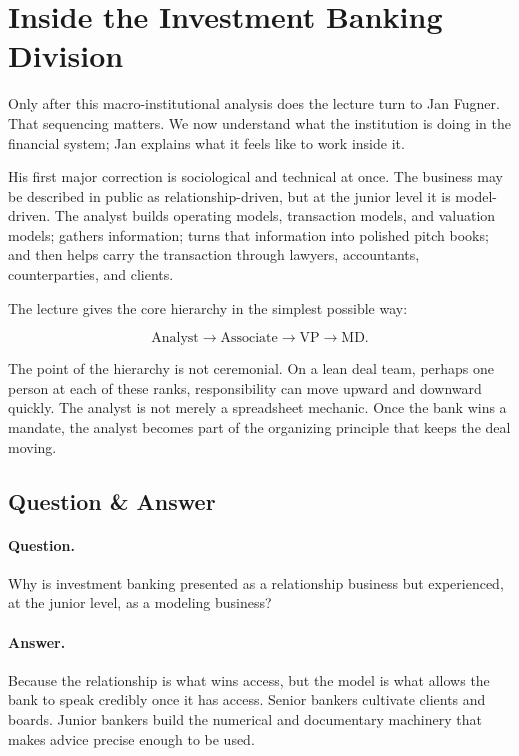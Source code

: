 \section{Inside the Investment Banking Division}

Only after this macro-institutional analysis does the lecture turn to Jan Fugner. That sequencing matters. We now understand what the institution is doing in the financial system; Jan explains what it feels like to work inside it.

His first major correction is sociological and technical at once. The business may be described in public as relationship-driven, but at the junior level it is model-driven. The analyst builds operating models, transaction models, and valuation models; gathers information; turns that information into polished pitch books; and then helps carry the transaction through lawyers, accountants, counterparties, and clients.

The lecture gives the core hierarchy in the simplest possible way:

\begin{equation}
\text{Analyst}\to\text{Associate}\to\text{VP}\to\text{MD}.
\end{equation}

The point of the hierarchy is not ceremonial. On a lean deal team, perhaps one person at each of these ranks, responsibility can move upward and downward quickly. The analyst is not merely a spreadsheet mechanic. Once the bank wins a mandate, the analyst becomes part of the organizing principle that keeps the deal moving.

\subsection{Question \& Answer}

\paragraph{Question.} Why is investment banking presented as a relationship business but experienced, at the junior level, as a modeling business?

\paragraph{Answer.} Because the relationship is what wins access, but the model is what allows the bank to speak credibly once it has access. Senior bankers cultivate clients and boards. Junior bankers build the numerical and documentary machinery that makes advice precise enough to be used.

